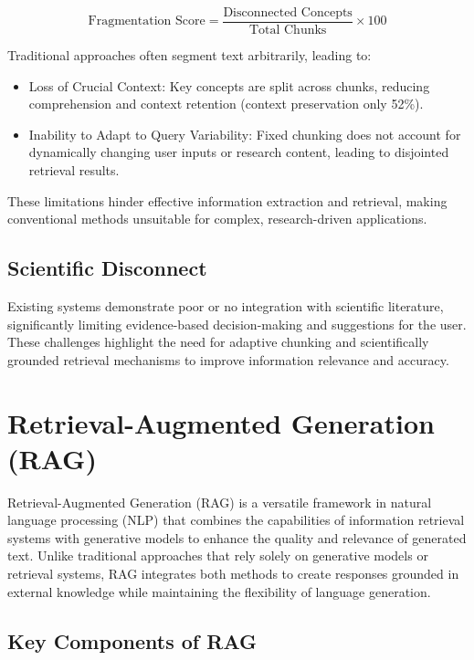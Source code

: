 \documentclass[conference]{IEEEtran}
\begin{document}
\begin{equation}  
\text{Fragmentation Score} = \frac{\text{Disconnected Concepts}}{\text{Total Chunks}} \times 100  
\end{equation}  

Traditional approaches often segment text arbitrarily, leading to:  

\begin{itemize}  
    \item Loss of Crucial Context: Key concepts are split across chunks, reducing comprehension and context retention (context preservation only 52\%).  
    \item Inability to Adapt to Query Variability: Fixed chunking does not account for dynamically changing user inputs or research content, leading to disjointed retrieval results.  
\end{itemize}  

These limitations hinder effective information extraction and retrieval, making conventional methods unsuitable for complex, research-driven applications.  

\subsection{Scientific Disconnect}
Existing systems demonstrate poor or no integration with scientific literature, significantly limiting evidence-based decision-making and suggestions for the user.\\

These challenges highlight the need for adaptive chunking and scientifically grounded retrieval mechanisms to improve information relevance and accuracy.  

\section{Retrieval-Augmented Generation (RAG)}

Retrieval-Augmented Generation (RAG) is a versatile framework in natural language processing (NLP) that combines the capabilities of information retrieval systems with generative models to enhance the quality and relevance of generated text. Unlike traditional approaches that rely solely on generative models or retrieval systems, RAG integrates both methods to create responses grounded in external knowledge while maintaining the flexibility of language generation. \cite{1} \cite{2}

\subsection{Key Components of RAG}
\end{document}

